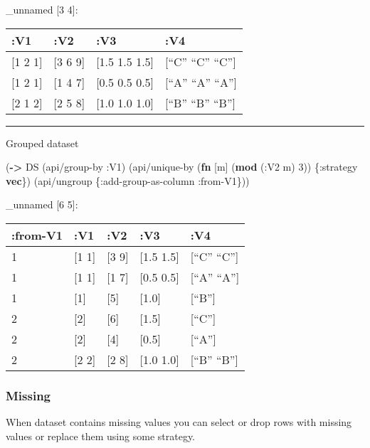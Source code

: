 \documentclass[]{article}
\newenvironment{Shaded}{\begin{snugshade}}{\end{snugshade}}
\newcommand{\KeywordTok}[1]{\textcolor[rgb]{0.13,0.29,0.53}{\textbf{#1}}}
\newcommand{\DecValTok}[1]{\textcolor[rgb]{0.00,0.00,0.81}{#1}}
\newcommand{\AttributeTok}[1]{\textcolor[rgb]{0.77,0.63,0.00}{#1}}
\newcommand{\NormalTok}[1]{#1}
\begin{document}
\_unnamed {[}3 4{]}:

\begin{longtable}[]{@{}llll@{}}
\toprule
:V1 & :V2 & :V3 & :V4\tabularnewline
\midrule
\endhead
{[}1 2 1{]} & {[}3 6 9{]} & {[}1.5 1.5 1.5{]} & {[}``C'' ``C''
``C''{]}\tabularnewline
{[}1 2 1{]} & {[}1 4 7{]} & {[}0.5 0.5 0.5{]} & {[}``A'' ``A''
``A''{]}\tabularnewline
{[}2 1 2{]} & {[}2 5 8{]} & {[}1.0 1.0 1.0{]} & {[}``B'' ``B''
``B''{]}\tabularnewline
\bottomrule
\end{longtable}

\begin{center}\rule{0.5\linewidth}{0.5pt}\end{center}

Grouped dataset

\begin{Shaded}
\begin{Highlighting}[]
\NormalTok{(}\KeywordTok{->}\NormalTok{ DS}
\NormalTok{    (api/group-by }\AttributeTok{:V1}\NormalTok{)}
\NormalTok{    (api/unique-by (}\KeywordTok{fn}\NormalTok{ [m] (}\KeywordTok{mod}\NormalTok{ (}\AttributeTok{:V2}\NormalTok{ m) }\DecValTok{3}\NormalTok{)) \{}\AttributeTok{:strategy} \KeywordTok{vec}\NormalTok{\})}
\NormalTok{    (api/ungroup \{}\AttributeTok{:add-group-as-column} \AttributeTok{:from-V1}\NormalTok{\}))}
\end{Highlighting}
\end{Shaded}

\_unnamed {[}6 5{]}:

\begin{longtable}[]{@{}lllll@{}}
\toprule
:from-V1 & :V1 & :V2 & :V3 & :V4\tabularnewline
\midrule
\endhead
1 & {[}1 1{]} & {[}3 9{]} & {[}1.5 1.5{]} & {[}``C''
``C''{]}\tabularnewline
1 & {[}1 1{]} & {[}1 7{]} & {[}0.5 0.5{]} & {[}``A''
``A''{]}\tabularnewline
1 & {[}1{]} & {[}5{]} & {[}1.0{]} & {[}``B''{]}\tabularnewline
2 & {[}2{]} & {[}6{]} & {[}1.5{]} & {[}``C''{]}\tabularnewline
2 & {[}2{]} & {[}4{]} & {[}0.5{]} & {[}``A''{]}\tabularnewline
2 & {[}2 2{]} & {[}2 8{]} & {[}1.0 1.0{]} & {[}``B''
``B''{]}\tabularnewline
\bottomrule
\end{longtable}

\subsubsection{Missing}\label{missing}

When dataset contains missing values you can select or drop rows with
missing values or replace them using some strategy.
\end{document}
